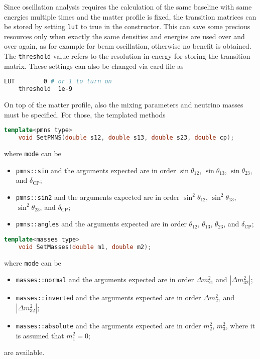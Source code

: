 \documentclass[a4paper, 11pt]{article}
\begin{document}
Since oscillation analysis requires the calculation of the same baseline with same energies multiple times and the matter profile is fixed, %
the transition matrices can be stored by setting \texttt{lut} to true in the constructor.
This can save some precious resources only when exactly the same densities and energies are used over and over again, %
as for example for beam oscillation, otherwise no benefit is obtained.
The \texttt{threshold} value refers to the resolution in energy for storing the transition matrix.
These settings can also be changed via card file as
\begin{lstlisting}[language=bash]
    LUT        0 # or 1 to turn on
    threshold  1e-9
\end{lstlisting}

On top of the matter profile, also the mixing parameters and neutrino masses must be specified. For those, the templated methods %
\begin{lstlisting}[language=C++]
    template<pmns type>
    void SetPMNS(double s12, double s13, double s23, double cp);
\end{lstlisting}
where \texttt{mode} can be
\begin{itemize}
		\small
	\item \texttt{pmns::sin} and the arguments expected are in order $\sin \theta_{12}$, $\sin \theta_{13}$, $\sin \theta_{23}$, %
		and $\delta_\text{CP}$;
	\item \texttt{pmns::sin2} and the arguments expected are in order $\sin^2\theta_{12}$, $\sin^2\theta_{13}$, $\sin^2\theta_{23}$, %
		and $\delta_\text{CP}$;
	\item \texttt{pmns::angles} and the arguments expected are in order $\theta_{12}$, $\theta_{13}$, $\theta_{23}$, %
		and $\delta_\text{CP}$;
\end{itemize}
\begin{lstlisting}[language=C++]
    template<masses type>
    void SetMasses(double m1, double m2);
\end{lstlisting}
where \texttt{mode} can be
\begin{itemize}
		\small
	\item \texttt{masses::normal} and the arguments expected are in order $\Delta m_{21}^2$ and $|\Delta m_{32}^2|$;
	\item \texttt{masses::inverted} and the arguments expected are in order $\Delta m_{21}^2$ and $|\Delta m_{32}^2|$;
	\item \texttt{masses::absolute} and the arguments expected are in order $m_2^2$, $m_3^2$, where it is assumed that $m_1^2 = 0$;
\end{itemize}
are available.
\end{document}
